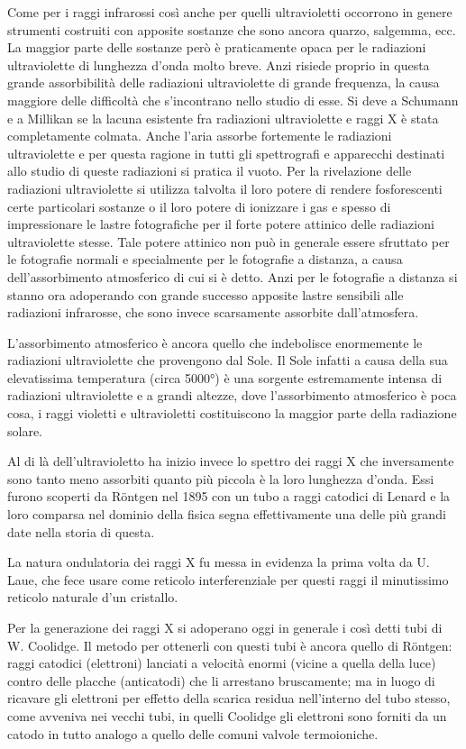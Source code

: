 \documentclass[a4paper]{article}
\begin{document}
Come per i raggi infrarossi così anche per quelli ultravioletti occorrono in genere strumenti costruiti con apposite sostanze che sono ancora quarzo, salgemma, ecc. La maggior parte delle sostanze però è praticamente opaca per le radiazioni ultraviolette di lunghezza d'onda molto breve. Anzi risiede proprio in questa grande assorbibilità delle radiazioni ultraviolette di grande frequenza, la causa maggiore delle difficoltà che s'incontrano nello studio di esse. Si deve a Schumann e a Millikan se la lacuna esistente fra radiazioni ultraviolette e raggi X è stata completamente colmata. Anche l'aria assorbe fortemente le radiazioni ultraviolette e per questa ragione in tutti gli spettrografi e apparecchi destinati allo studio di queste radiazioni si pratica il vuoto. Per la rivelazione delle radiazioni ultraviolette si utilizza talvolta il loro potere di rendere fosforescenti certe particolari sostanze o il loro potere di ionizzare i gas e spesso di impressionare le lastre fotografiche per il forte potere attinico delle radiazioni ultraviolette stesse. Tale potere attinico non può in generale essere sfruttato per le fotografie normali e specialmente per le fotografie a distanza, a causa dell'assorbimento atmosferico di cui si è detto. Anzi per le fotografie a distanza si stanno ora adoperando con grande successo apposite lastre sensibili alle radiazioni infrarosse, che sono invece scarsamente assorbite dall'atmosfera.

L'assorbimento atmosferico è ancora quello che indebolisce enormemente le radiazioni ultraviolette che provengono dal Sole. Il Sole infatti a causa della sua elevatissima temperatura (circa 5000°) è una sorgente estremamente intensa di radiazioni ultraviolette e a grandi altezze, dove l'assorbimento atmosferico è poca cosa, i raggi violetti e ultravioletti costituiscono la maggior parte della radiazione solare.

Al di là dell'ultravioletto ha inizio invece lo spettro dei raggi X che inversamente sono tanto meno assorbiti quanto più piccola è la loro lunghezza d'onda. Essi furono scoperti da Röntgen nel 1895 con un tubo a raggi catodici di Lenard e la loro comparsa nel dominio della fisica segna effettivamente una delle più grandi date nella storia di questa.

La natura ondulatoria dei raggi X fu messa in evidenza la prima volta da U. Laue, che fece usare come reticolo interferenziale per questi raggi il minutissimo reticolo naturale d'un cristallo.

Per la generazione dei raggi X si adoperano oggi in generale i così detti tubi di W. Coolidge. Il metodo per ottenerli con questi tubi è ancora quello di Röntgen: raggi catodici (elettroni) lanciati a velocità enormi (vicine a quella della luce) contro delle placche (anticatodi) che li arrestano bruscamente; ma in luogo di ricavare gli elettroni per effetto della scarica residua nell'interno del tubo stesso, come avveniva nei vecchi tubi, in quelli Coolidge gli elettroni sono forniti da un catodo in tutto analogo a quello delle comuni valvole termoioniche.
\end{document}
